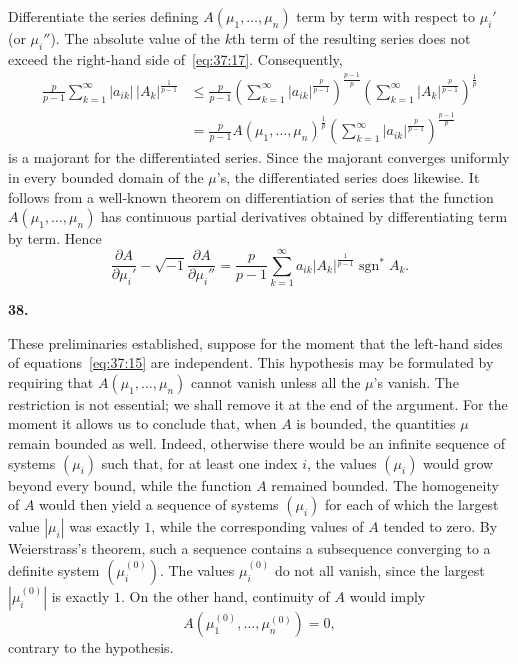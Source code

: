 \documentclass[
  paper=b5,
  fontsize=13pt,
  twoside=true,
  open=any,
  bookmarkpackage=false,
  chapterprefix=true,
  headings=normal
]{scrbook}
\theoremstyle{definition}
\newcommand{\numberedparagraph}[1]{%
  \par\medskip\phantomsection\label{sec:#1}%
  \noindent\textbf{#1.}\enspace
}
\begin{document}
Differentiate the series defining $A(\mu_1,\ldots,\mu_n)$ term by term with respect to $\mu_i'$ (or $\mu_i''$). The absolute value of the $k$th term of the resulting series does not exceed the right-hand side of~\eqref{eq:37:17}. Consequently,
\begin{align*}
 \frac{p}{p-1}\sum_{k=1}^{\infty}|a_{ik}|\,|A_k|^{\frac1{p-1}}
 &\leq\frac{p}{p-1}
 \left(\sum_{k=1}^{\infty}|a_{ik}|^{\frac{p}{p-1}}\right)^{\frac{p-1}{p}}
 \left(\sum_{k=1}^{\infty}|A_k|^{\frac{p}{p-1}}\right)^{\frac1p}\\
 &=\frac{p}{p-1}A(\mu_1,\ldots,\mu_n)^{\frac1p}
 \left(\sum_{k=1}^{\infty}|a_{ik}|^{\frac{p}{p-1}}\right)^{\frac{p-1}{p}}
\end{align*}
is a majorant for the differentiated series. Since the majorant converges uniformly in every bounded domain of the $\mu$'s, the differentiated series does likewise. It follows from a well-known theorem on differentiation of series that the
function $A(\mu_1,\ldots,\mu_n)$ has continuous partial derivatives obtained by differentiating term by term. Hence
\begin{equation}
 \frac{\partial A}{\partial\mu_i'}
 -\sqrt{-1}\frac{\partial A}{\partial\mu_i''}
 =\frac{p}{p-1}\sum_{k=1}^{\infty}
 a_{ik}|A_k|^{\frac1{p-1}}\operatorname{sgn}^{*}A_k.
 \tag{18}\label{eq:37:18}
\end{equation}

\numberedparagraph{38}
These preliminaries established, suppose for the moment that the left-hand sides of equations~\eqref{eq:37:15} are independent. This hypothesis may be formulated by requiring that $A(\mu_1,\ldots,\mu_n)$ cannot vanish unless all the $\mu$'s vanish. The restriction is not essential; we shall remove it at the end of the argument. For the moment it allows us to conclude that, when $A$ is bounded, the quantities $\mu$ remain bounded as well. Indeed, otherwise there would be an infinite sequence of systems $(\mu_i)$ such that, for at least one index $i$, the values $(\mu_i)$ would grow beyond every bound, while the function $A$ remained bounded. The homogeneity of $A$ would then yield a sequence of systems $(\mu_i)$ for each of which the largest value $|\mu_i|$ was exactly $1$, while the corresponding values of $A$ tended to zero. By Weierstrass's theorem, such a sequence contains a subsequence converging to a definite system $(\mu_i^{(0)})$. The values $\mu_i^{(0)}$ do not all vanish, since the largest $|\mu_i^{(0)}|$ is exactly $1$. On the other hand, continuity of $A$ would imply
\[
 A(\mu_1^{(0)},\ldots,\mu_n^{(0)})=0,
\]
contrary to the hypothesis.
\end{document}
